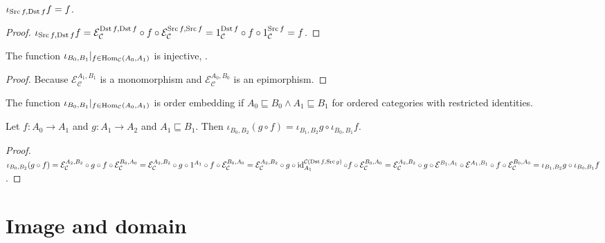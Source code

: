 \begin{prop}
  $\iota_{\operatorname{Src} f, \operatorname{Dst} f} f = f$.
\end{prop}

\begin{proof}
  $\iota_{\operatorname{Src} f, \operatorname{Dst} f} f = \mathcal{E}_\mathcal{C}^{\operatorname{Dst} f,\operatorname{Dst} f} \circ f \circ \mathcal{E}_\mathcal{C}^{\operatorname{Src} f,\operatorname{Src} f} =
  1_{\mathcal{C}}^{\operatorname{Dst} f} \circ f \circ 1_{\mathcal{C}}^{\operatorname{Src} f} = f$.
\end{proof}

\begin{prop}
  The function $\iota_{B_0, B_1} |_{f \in \operatorname{Hom}_{\mathcal{C}} (A_0 ,
  A_1)}$ is injective, .
\end{prop}

\begin{proof}
  Because $\mathcal{E}_{\mathcal{C}}^{A_1,B_1}$ is a monomorphism and $\mathcal{E}_{\mathcal{C}}^{A_0,B_0}$ is an epimorphism.
\end{proof}

\begin{cor}\label{iota-emb}
  The function $\iota_{B_0, B_1} |_{f \in \operatorname{Hom}_{\mathcal{C}} (A_0 ,
  A_1)}$ is order embedding if $A_0 \sqsubseteq B_0 \wedge A_1 \sqsubseteq B_1$ for ordered categories
  with restricted identities.
\end{cor}

\begin{prop}\label{iota-comp}
  Let $f : A_0 \rightarrow A_1$ and $g : A_1 \rightarrow A_2$ and $A_1
  \sqsubseteq B_1$. Then $\iota_{B_0, B_2} (g \circ f) = \iota_{B_1, B_2} g
  \circ \iota_{B_0, B_1} f$.
\end{prop}

\begin{proof}
  $\iota_{B_0, B_2} (g \circ f) = \mathcal{E}_{\mathcal{C}}^{A_2,B_2}
  \circ g \circ f \circ \mathcal{E}_{\mathcal{C}}^{B_0,A_0} = \mathcal{E}_{\mathcal{C}}^{A_2,B_2} \circ g \circ 1^{A_1} \circ f
  \circ \mathcal{E}_{\mathcal{C}}^{B_0,A_0} = \mathcal{E}_{\mathcal{C}}^{A_2,B_2} \circ g \circ \operatorname{id}^{\mathcal{C}(\operatorname{Dst} f,\operatorname{Src} g)}_{A_1} \circ f
  \circ \mathcal{E}_{\mathcal{C}}^{B_0,A_0} = \mathcal{E}_{\mathcal{C}}^{A_2,B_2} \circ g \circ \mathcal{E}^{B_1,A_1}
  \circ \mathcal{E}^{A_1,B_1} \circ f \circ \mathcal{E}_{\mathcal{C}}^{B_0,A_0} = \iota_{B_1, B_2} g \circ \iota_{B_0,
  B_1} f$.
\end{proof}

\section{Image and domain}

